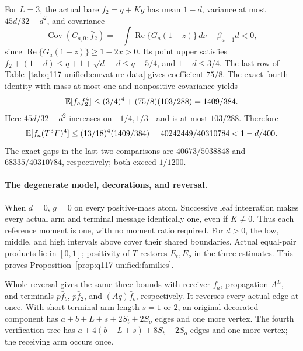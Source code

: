 For \(L=3\), the actual bare \(\bar f_2=q+Kg\) has mean
\(1-d\), variance at most \(45d/32-d^2\), and covariance
\[
 \operatorname{Cov}(C_{a,0},\bar f_2)
 =-\int\operatorname{Re}\{G_a(1+z)\}\,d\nu-\beta_{a+1}d<0,
\]
since \(\operatorname{Re}\{G_a(1+z)\}\ge1-2x>0\).
Its point upper satisfies
\(\bar f_2+(1-d)\le q+1+\sqrt d-d\le q+5/4\),
and \(1-d\le3/4\). The last row of
Table~\ref{tab:q117-unified:curvature-data} gives coefficient
\(75/8\). The exact fourth identity with mass at most one and
nonpositive covariance yields
\begin{equation}\label{eq:q117-unified:bare-high-fourth}
 \mathbb E[f_a\bar f_2^4]
 \le(3/4)^4+(75/8)(103/288)=1409/384.
\end{equation}
Here \(45d/32-d^2\) increases on \([1/4,1/3]\) and is
at most \(103/288\). Therefore
\begin{equation}\label{eq:q117-unified:high-three-step}
 \mathbb E[f_a(T^3F)^4]
 \le(13/18)^4(1409/384)
 =40242449/40310784<1-d/400.
\end{equation}
The exact gaps in the last two comparisons are
\(40673/5038848\) and \(68335/40310784\), respectively;
both exceed \(1/1200\).

\paragraph{The degenerate model, decorations, and reversal.}
When \(d=0\), \(g=0\) on every positive-mass atom.
Successive leaf integration makes every actual arm and terminal
message identically one, even if \(K\ne0\). Thus each reference
moment is one, with no moment ratio required.
For \(d>0\), the low, middle, and high intervals above cover
their shared boundaries. Actual equal-pair products lie in
\([0,1]\); positivity of \(T\) restores \(E_t,E_o\) in
the three estimates. This proves
Proposition~\ref{prop:q117-unified:families}.

Whole reversal gives the same three bounds with receiver
\(\bar f_a\), propagation \(A^L\), and terminals
\(p\bar f_b\), \(p\bar f_2\), and \((Aq)\bar f_b\),
respectively. It reverses every actual edge at once.
With short terminal-arm length \(s=1\) or \(2\), an original
decorated component has \(a+b+L+s+2S_t+2S_o\) edges and
one more vertex. The fourth verification tree has
\(a+4(b+L+s)+8S_t+2S_o\) edges and one more vertex;
the receiving arm occurs once.

